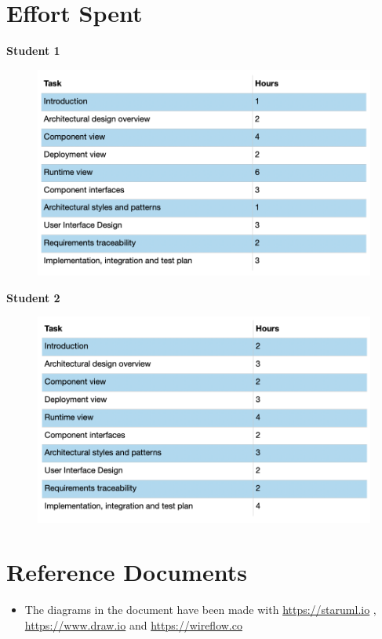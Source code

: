 \documentclass{article}
\begin{document}
\section{Effort Spent}

\textbf{Student 1}

\begin{figure}[H]
  \includegraphics[width=\linewidth]{effort1.png}
  
\end{figure}

\textbf{Student 2}

\begin{figure}[H]
  \includegraphics[width=\linewidth]{effort2.png}
  
\end{figure}

\section{Reference Documents}
\begin{itemize}
\item The diagrams in the document have been made with \url{https://staruml.io} , \url{https://www.draw.io} and \url{https://wireflow.co}

\end{itemize}
\end{document}
